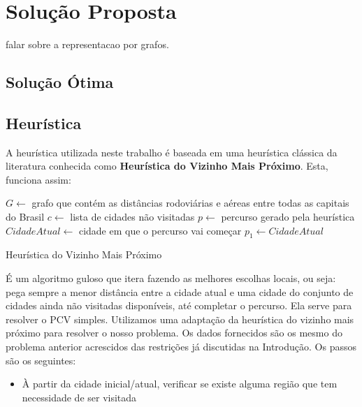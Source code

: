 \documentclass[12pt]{article}
\begin{document}
\section{Solução Proposta}
\label{solucao_proposta}

falar sobre a representacao por grafos.

\subsection{Solução Ótima}


\subsection{Heurística}
A heurística utilizada neste trabalho é baseada em uma heurística clássica da literatura
conhecida como \textbf{Heurística do Vizinho Mais Próximo}. Esta, funciona assim:

\begin{algorithm}[h!]
\begin{footnotesize}
  $G \longleftarrow $ grafo que contém as distâncias rodoviárias e aéreas entre todas as 
  capitais do Brasil\;
  $c \longleftarrow $ lista de cidades não visitadas\;
  $p \longleftarrow $ percurso gerado pela heurística\;
  $CidadeAtual \longleftarrow $ cidade em que o percurso vai começar\;
  $p_{1} \longleftarrow CidadeAtual$\;
\caption{Heurística do Vizinho Mais Próximo}
\end{footnotesize}
\end{algorithm}

É um algoritmo guloso que itera fazendo as melhores escolhas locais, ou seja:
pega sempre a menor distância entre a cidade atual e uma cidade do conjunto de cidades ainda
não visitadas disponíveis, até completar o percurso. Ela serve para resolver o PCV simples. 
Utilizamos uma adaptação da heurística do vizinho mais próximo para resolver o nosso problema.
Os dados fornecidos são os mesmo do problema anterior acrescidos das restrições já discutidas na 
Introdução. Os passos são os seguintes:

\begin{itemize}
  \item À partir da cidade inicial/atual, verificar se existe alguma região que tem necessidade
  de ser visitada
  
\end{itemize}
\end{document}
